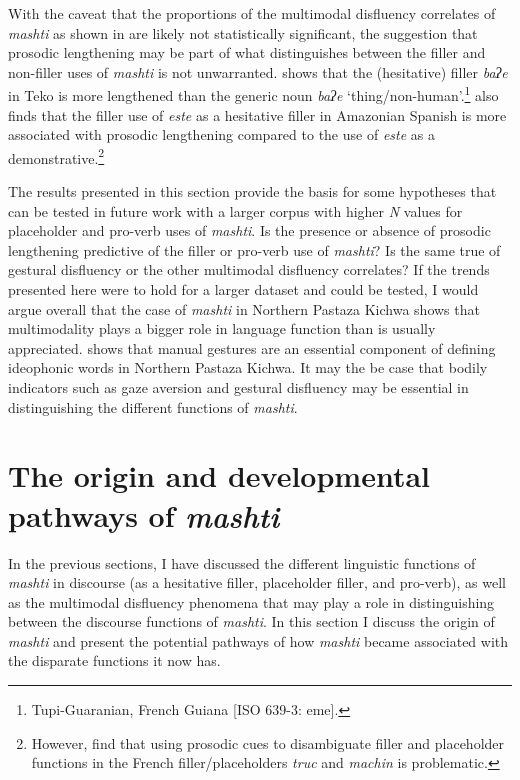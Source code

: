 \documentclass[output=paper]{langscibook}
\begin{document}
With the caveat that the proportions of the multimodal disfluency correlates of \textit{mashti} as shown in  are likely not statistically significant, the suggestion that prosodic lengthening may be part of what distinguishes between the filler and non-filler uses of \textit{mashti} is not unwarranted. \citet{chapters/rose} shows that the (hesitative) filler \textit{baʔe} in Teko is more lengthened than the generic noun \textit{baʔe} ‘thing/non-human’.\footnote{Tupi-Guaranian, French Guiana [ISO 639-3: eme].} \citet{Vallejos-Yopán2023} also finds that the filler use of \textit{este} as a hesitative filler in Amazonian Spanish is more associated with prosodic lengthening compared to the use of \textit{este} as a demonstrative.\footnote{However, \citet{HenneckeMihatsch2022} find that using prosodic cues to disambiguate filler and placeholder functions in the French filler/placeholders \textit{truc} and \textit{machin} is problematic.} 

The results presented in this section provide the basis for some hypotheses that can be tested in future work with a larger corpus with higher \textit{N} values for placeholder and pro-verb uses of \textit{mashti}. Is the presence or absence of prosodic lengthening predictive of the filler or pro-verb use of \textit{mashti}? Is the same true of gestural disfluency or the other multimodal disfluency correlates?  If the trends presented here were to hold for a larger dataset and could be tested, I would argue overall that the case of \textit{mashti} in Northern Pastaza Kichwa shows that multimodality plays a bigger role in language function than is usually appreciated. \citet{Nuckolls2020e} shows that manual gestures are an essential component of defining ideophonic words in Northern Pastaza Kichwa. It may the be case that bodily indicators such as gaze aversion and gestural disfluency may be essential in distinguishing the different functions of \textit{mashti}.

\section{The origin and developmental pathways of \textit{mashti}}
\label{sec:rice:5}

In the previous sections, I have discussed the different linguistic functions of \textit{mashti} in discourse (as a hesitative filler, placeholder filler, and pro-verb), as well as the multimodal disfluency phenomena that may play a role in distinguishing between the discourse functions of \textit{mashti}. In this section I discuss the origin of \textit{mashti} and present the potential pathways of how \textit{mashti} became associated with the disparate functions it now has.
\end{document}
